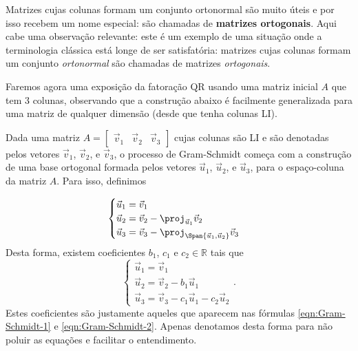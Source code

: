 Matrizes cujas colunas formam um conjunto ortonormal são muito úteis e por isso recebem um nome especial: são chamadas de \textbf{matrizes ortogonais}. Aqui cabe uma observação relevante: este é um exemplo de uma situação onde a terminologia clássica está longe de ser satisfatória: matrizes  cujas colunas formam um conjunto {\it ortonormal} são chamadas de matrizes {\it ortogonais}.

\medskip

Faremos agora uma exposição da fatoração QR usando uma matriz inicial $A$ que tem 3 colunas, observando que a construção abaixo é facilmente generalizada para uma matriz de qualquer dimensão (desde que tenha colunas LI).

Dada uma matriz $A=\begin{bmatrix}
\vec{v}_1 & \vec{v}_2 & \vec{v}_3
\end{bmatrix}$ cujas colunas são LI e são denotadas pelos vetores $\vec{v}_1$, $\vec{v}_2$, e $\vec{v}_3$,
o processo de Gram-Schmidt começa com a construção de uma base ortogonal formada pelos vetores
$\vec{u}_1$, $\vec{u}_2$, e $\vec{u}_3$,
para o espaço-coluna da matriz $A$. Para isso, definimos

\begin{equation}
\begin{cases}
\vec{u}_1 = \vec{v}_1 \\
\vec{u}_2 = \vec{v}_2 - \proj_{\vec{u}_1} \vec{v}_2 \\
\vec{u}_3 = \vec{v}_3 - \proj_{\Span\{\vec{u}_1,\vec{u}_2\}} \vec{v}_3
\end{cases}
\end{equation}
Desta forma, existem coeficientes $b_1$, $c_1$ e $c_2 \in \mathbb{R}$ tais que
\begin{equation}
\begin{cases}
\vec{u}_1 = \vec{v}_1 \\
\vec{u}_2 = \vec{v}_2 - b_1 \vec{u}_1 \\
\vec{u}_3 = \vec{v}_3 - c_1 \vec{u}_1 - c_2 \vec{u}_2
\end{cases}.
\end{equation} Estes coeficientes são justamente aqueles que aparecem nas fórmulas \eqref{eqn:Gram-Schmidt-1} e \eqref{eqn:Gram-Schmidt-2}. Apenas denotamos desta forma para não poluir as equações e facilitar o entendimento.

